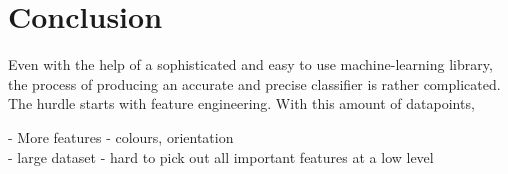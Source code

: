 \documentclass[dissertation.tex]{subfiles}
\begin{document}
\chapter{Conclusion}
Even with the help of a sophisticated and easy to use machine-learning library, the process of producing an accurate and precise classifier is rather complicated. The hurdle starts with feature engineering. With this amount of datapoints,

- More features - colours, orientation \\
- large dataset - hard to pick out all important features at a low level
\end{document}

